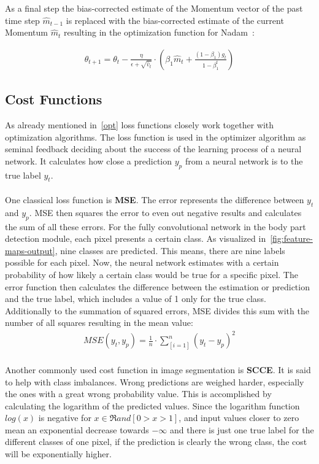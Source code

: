 As a final step the bias-corrected estimate of the Momentum vector of the past time step $\hat{m}_{t-1}$ is replaced
with the bias-corrected estimate of the current Momentum $\hat{m}_{t}$ resulting in the optimization function for \gls{Nadam}~\cite{optimizersoverview}:



\begin{align}
    \theta_{t+1} = \theta_{t} - \frac{\eta}{\epsilon+\sqrt{\hat{v}_t}} \cdot (\beta_1\hat{m}_t+\frac{(1-\beta_1)g_t}{1-\beta_1^t}) \label{eqn:nadam:8}
\end{align}


\subsection{Cost Functions}
\label{cost}
As already mentioned in~\autoref{opt} loss functions closely work together with optimization algorithms.
The loss function is used in the optimizer algorithm as seminal feedback deciding about the success of the learning process of a
neural network.
It calculates how close a prediction $y_p$ from a neural network is to the true label $y_t$.
\\\mbox{}\\
One classical loss function is \textbf{\gls{MSE}}.
The error represents the difference between $y_t$ and $y_p$.
\gls{MSE} then squares the error to even out negative results and calculates the sum of all these errors.
For the fully convolutional network in the body part detection module, each pixel presents a certain class.
As visualized in~\ref{fig:feature-maps-output}, nine classes are predicted.
This means, there are nine labels possible for each pixel.
Now, the neural network estimates with a certain probability of how likely a certain class would be true for a specific pixel.
The error function then calculates the difference between the estimation or prediction and the true label, which includes a
value of 1 only for the true class.
Additionally to the summation of squared errors, \gls{MSE} divides this sum with the number of all squares resulting in the mean
value:
\\
\begin{align}
    MSE(y_t,y_p) = \frac{1}{n}\cdot\sum_[i=1]^n(y_t-y_p)^2
\end{align}
\\
Another commonly used cost function in image segmentation is \textbf{\gls{SCCE}}.
It is said to help with class imbalances.
Wrong predictions are weighed harder, especially the ones with a great wrong probability value.
This is accomplished by calculating the logarithm of the predicted values.
Since the logarithm function $log(x)$ is negative for $x \in \Re and [0>x>1]$, and input values closer to zero mean
an exponential decrease towards $-\infty$ and there is just one true label for the different classes of one pixel, if
the prediction is clearly the wrong class, the cost will be exponentially higher.


